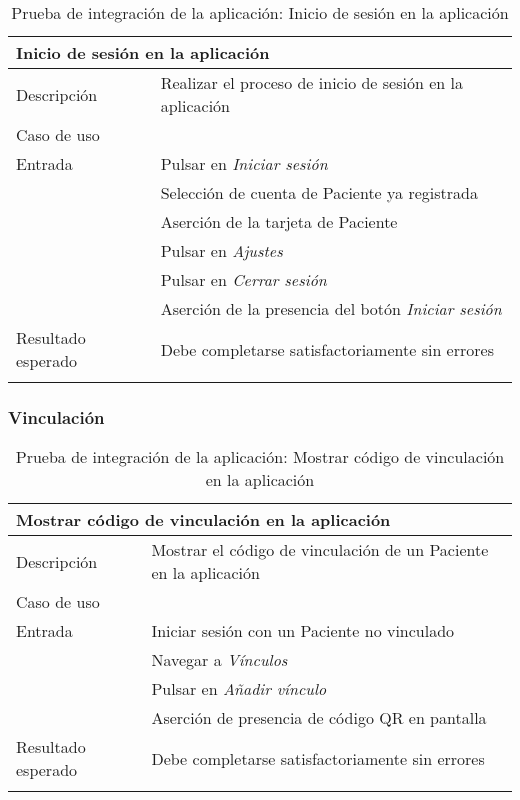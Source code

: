 \begin{longtable}{|p{} p{}|}
    \hline
    \multicolumn{2}{|l|}{\textbf{Inicio de sesión en la aplicación}} \\ \hline 
    Descripción                 & Realizar el proceso de inicio de sesión en la aplicación \\ \hline
    Caso de uso                 & \nameref{cu:iniciar_sesion} \\ \hline
    Entrada                     & Pulsar en \emph{Iniciar sesión} \\
                                & Selección de cuenta de Paciente ya registrada \\ 
                                & Aserción de la tarjeta de Paciente \\ 
                                & Pulsar en \emph{Ajustes} \\ 
                                & Pulsar en \emph{Cerrar sesión} \\
                                & Aserción de la presencia del botón \emph{Iniciar sesión} \\ \hline
    Resultado esperado          & Debe completarse satisfactoriamente sin errores \\ \hline
    \caption{Prueba de integración de la aplicación: Inicio de sesión en la aplicación}
    \label{cp:i:app:inicio_sesion}
\end{longtable}

\newpage
\subsubsection{Vinculación}

\begin{longtable}{|p{} p{}|}
    \hline
    \multicolumn{2}{|l|}{\textbf{Mostrar código de vinculación en la aplicación}} \\ \hline 
    Descripción                 & Mostrar el código de vinculación de un Paciente en la aplicación \\ \hline
    Caso de uso                 & \nameref{cu:vincular_paciente} \\ \hline
    Entrada                     & Iniciar sesión con un Paciente no vinculado \\
                                & Navegar a \emph{Vínculos} \\ 
                                & Pulsar en \emph{Añadir vínculo} \\
                                & Aserción de presencia de código QR en pantalla \\ \hline
    Resultado esperado          & Debe completarse satisfactoriamente sin errores \\ \hline
    \caption{Prueba de integración de la aplicación: Mostrar código de vinculación en la aplicación}
    \label{cp:i:app:mostrar_codigo_vinculacion}
\end{longtable}


